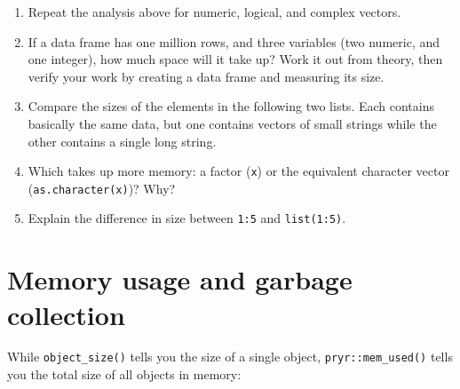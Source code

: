 \begin{enumerate}
\def\labelenumi{\arabic{enumi}.}
\item
  Repeat the analysis above for numeric, logical, and complex vectors.
\item
  If a data frame has one million rows, and three variables (two
  numeric, and one integer), how much space will it take up? Work it out
  from theory, then verify your work by creating a data frame and
  measuring its size.
\item
  Compare the sizes of the elements in the following two lists. Each
  contains basically the same data, but one contains vectors of small
  strings while the other contains a single long string.

\begin{Shaded}
\begin{Highlighting}[]
\StringTok{ }\NormalTok{(}\OperatorTok{:}\NormalTok{, }\NormalTok{(}\NormalTok{, }\NormalTok{(}
\StringTok{ } \NormalTok{)}
\end{Highlighting}
\end{Shaded}
\item
  Which takes up more memory: a factor (\texttt{x}) or the equivalent
  character vector (\texttt{as.character(x)})? Why?
\item
  Explain the difference in size between \texttt{1:5} and
  \texttt{list(1:5)}.
\end{enumerate}

\hypertarget{gc}{%
\section{Memory usage and garbage collection}\label{gc}}

While \texttt{object\_size()} tells you the size of a single object,
\texttt{pryr::mem\_used()} tells you the total size of all objects in
memory: 

\begin{Shaded}
\begin{Highlighting}[]
\NormalTok{()}
\end{Highlighting}
\end{Shaded}


